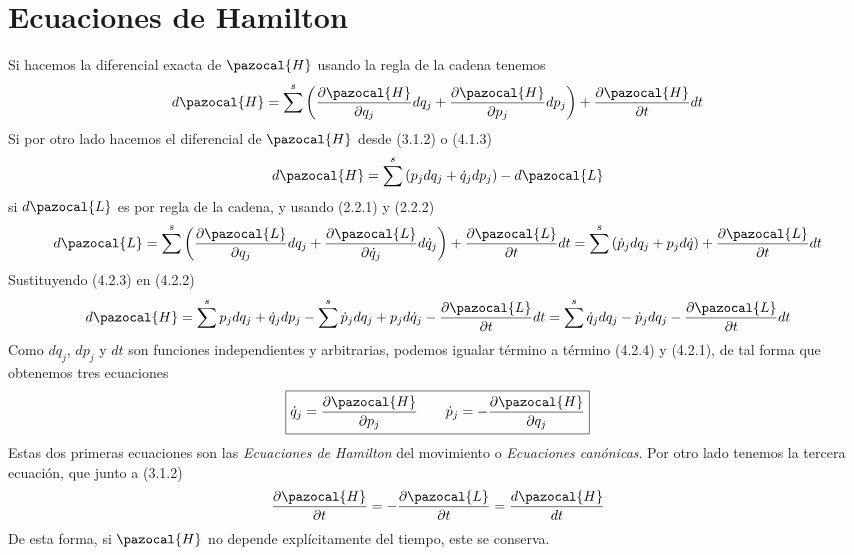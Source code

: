 \section{Ecuaciones de Hamilton} 
Si hacemos la diferencial exacta de $\pazocal{H}$ usando la regla de la cadena tenemos
\begin{equation} \label{4.2.1}
    d\pazocal{H} = \sum^s\left(\frac{\partial \pazocal{H}}{\partial q_j}dq_j+\frac{\partial \pazocal{H}}{\partial p_j}dp_j\right)+\frac{\partial \pazocal{H}}{\partial t} dt
\end{equation} 
Si por otro lado hacemos el diferencial de $\pazocal{H}$ desde (3.1.2) o (4.1.3)
\begin{equation} \label{4.2.2}
    d\pazocal{H} = \sum^s\left(p_j dq_j+\dot{q}_j dp_j\right)-d\pazocal{L}
\end{equation} 
si $d\pazocal{L}$ es por regla de la cadena, y usando (2.2.1) y (2.2.2)
\begin{equation} \label{4.2.3}
    d\pazocal{L}= \sum^s\left(\frac{\partial \pazocal{L}}{\partial q_j}dq_j+\frac{\partial \pazocal{L}}{\partial \dot{q}_j}d\dot{q}_j\right) + \frac{\partial \pazocal{L}}{\partial t}dt = \sum^s\left(\dot{p}_j dq_j+p_j d\dot{q}\right) + \frac{\partial \pazocal{L}}{\partial t}dt
\end{equation} 
Sustituyendo (4.2.3) en (4.2.2)
\begin{equation} \label{4.2.4}
    d\pazocal{H} = \sum^s p_j dq_j+\dot{q}_j dp_j-\sum^s \dot{p}_j dq_j+p_j d\dot{q}_j - \frac{\partial \pazocal{L}}{\partial t}dt = \sum^s \dot{q}_j dq_j-\dot{p}_j dq_j - \frac{\partial \pazocal{L}}{\partial t}dt
\end{equation} 
Como $dq_j$, $dp_j$ y $dt$ son funciones independientes y arbitrarias, podemos igualar término a término (4.2.4) y (4.2.1), de tal forma que obtenemos tres ecuaciones
\Large \begin{equation} \label{4.2.5}
    \boxed{\dot{q}_j = \frac{\partial \pazocal{H}}{\partial p_j} \ \ \ \ \ \ \dot{p}_j= -\frac{\partial \pazocal{H}}{\partial q_j}}
\end{equation}  \normalsize
Estas dos primeras ecuaciones son las \textit{Ecuaciones de Hamilton} del movimiento o \textit{Ecuaciones canónicas}. Por otro lado tenemos la tercera ecuación, que junto a (3.1.2)
\begin{equation} \label{4.2.6}
    \frac{\partial \pazocal{H}}{\partial t} = - \frac{\partial \pazocal{L}}{\partial t} = \frac{d \pazocal{H}}{dt}
\end{equation} 
De esta forma, si $\pazocal{H}$ no depende explícitamente del tiempo, este se conserva.

